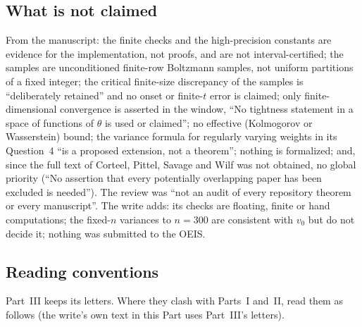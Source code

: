 \documentclass[11pt,letterpaper]{article}
\numberwithin{equation}{section}
\theoremstyle{definition}\newtheorem{definition}[theorem]{Definition}
\theoremstyle{remark}\newtheorem{remark}[theorem]{Remark}
\begin{document}
\subsection{What is not claimed}\label{dmv:fl:sec:nonclaims}

From the manuscript: the finite checks and the high-precision constants
are evidence for the implementation, not proofs, and are not
interval-certified; the samples are unconditioned finite-row Boltzmann
samples, not uniform partitions of a fixed integer; the critical
finite-size discrepancy of the samples is ``deliberately retained'' and no
onset or finite-$t$ error is claimed; only finite-dimensional convergence
is asserted in the window, ``No tightness statement in a space of
functions of $\theta$ is used or claimed''; no effective (Kolmogorov or
Wasserstein) bound; the variance formula for regularly varying weights in
its Question~4 ``is a proposed extension, not a theorem''; nothing is
formalized; and, since the full text of Corteel, Pittel, Savage and Wilf
was not obtained, no global priority (``No assertion that every
potentially overlapping paper has been excluded is needed''). The review
was ``not an audit of every repository theorem or every manuscript''. The
write adds: its checks are floating, finite or hand computations; the
fixed-$n$ variances to $n=300$ are consistent with $v_0$ but do not decide
it; nothing was submitted to the OEIS.

\subsection{Reading conventions}\label{dmv:fl:sec:notation}

Part~III keeps its letters. Where they clash with Parts~I and~II, read
them as follows (the write's own text in this Part uses Part~III's
letters).
\end{document}
